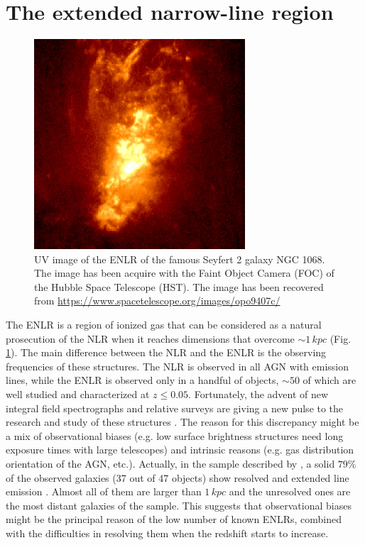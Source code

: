 \documentclass[../thesis.tex]{subfiles}
\begin{document}
\section{The extended narrow-line region}
\label{sec:ENLR}

\begin{figure}
\centering
\includegraphics[width=0.7\textwidth]{./images/opo9407c.jpg} 
\caption[]{UV image of the ENLR of the famous Seyfert 2 galaxy NGC 1068. The image has been acquire with the Faint Object Camera (FOC) of the Hubble Space Telescope (HST). The image has been recovered from \url{https://www.spacetelescope.org/images/opo9407c/}}
\label{fig:NGC1068}
\end{figure}

The ENLR is a region of ionized gas that can be considered as a natural prosecution of the NLR when it reaches dimensions that overcome $\sim 1\,\si{kpc}$ (Fig.\,\ref{fig:NGC1068}).
The main difference between the NLR and the ENLR is the observing frequencies of these structures.
The NLR is observed in all AGN with emission lines, while the ENLR is observed only in a handful of objects, $\sim50$ of which are well studied and characterized at $z\le0.05$.
Fortunately, the advent of new integral field spectrographs and relative surveys \citep[e.g. MaNGA,][]{Bundy15} are giving a new pulse to the research and study of these structures \citep{Husemann14,He18}.
The reason for this discrepancy might be a mix of observational biases (e.g. low surface brightness structures need long exposure times with large telescopes) and intrinsic reasons (e.g. gas distribution orientation of the AGN, etc.).
Actually, in the sample described by \citet{Mulchaey96a}, a solid $79\%$ of the observed galaxies (37 out of 47 objects) show resolved and extended line emission \citep{Mulchaey96b}. 
Almost all of them are larger than $1\,\si{kpc}$ and the unresolved ones are the most distant galaxies of the sample.
This suggests that observational biases might be the principal reason of the low number of known ENLRs, combined with the difficulties in resolving them when the redshift starts to increase. 
\end{document}
